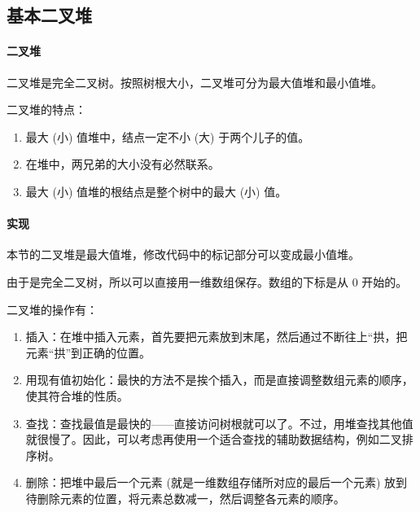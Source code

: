 \subsection{基本二叉堆}
\paragraph{二叉堆}
	二叉堆是完全二叉树。按照树根大小，二叉堆可分为最大值堆和最小值堆。
	
	二叉堆的特点：
	
	\begin{enumerate}
		\item 最大 (小) 值堆中，结点一定不小 (大) 于两个儿子的值。
		\item 在堆中，两兄弟的大小没有必然联系。
		\item 最大 (小) 值堆的根结点是整个树中的最大 (小) 值。
	\end{enumerate}
	
\paragraph{实现}
	本节的二叉堆是最大值堆，修改代码中的标记部分可以变成最小值堆。

	由于是完全二叉树，所以可以直接用一维数组保存。数组的下标是从 0 开始的。

	二叉堆的操作有：

	\begin{enumerate}
		\item 插入：在堆中插入元素，首先要把元素放到末尾，然后通过不断往上“拱，把元素“拱”到正确的位置。
		\item 用现有值初始化：最快的方法不是挨个插入，而是直接调整数组元素的顺序，使其符合堆的性质。
		\item 查找：查找最值是最快的------直接访问树根就可以了。不过，用堆查找其他值就很慢了。因此，可以考虑再使用一个适合查找的辅助数据结构，例如二叉排序树。
		\item 删除：把堆中最后一个元素 (就是一维数组存储所对应的最后一个元素) 放到待删除元素的位置，将元素总数减一，然后调整各元素的顺序。
	\end{enumerate}
	
	